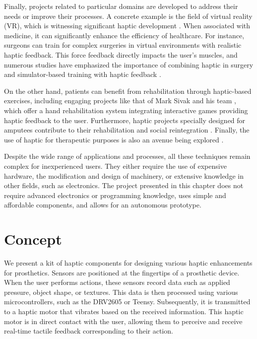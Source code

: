 Finally, projects related to particular domains are developed to address their needs or improve their processes. A concrete example is the field of virtual reality (VR), which is witnessing significant haptic development \cite{leleve_haptic_2020}. When associated with medicine, it can significantly enhance the efficiency of healthcare. For instance, surgeons can train for complex surgeries in virtual environments with realistic haptic feedback. This force feedback directly impacts the user's muscles, and numerous studies have emphasized the importance of combining haptic in surgery and simulator-based training with haptic feedback \cite{noauthor_role_nodate}\cite{willis_virtual_2014}\cite{correa_haptic_2019}\cite{escobar-castillejos_review_2016-1}\cite{singapogu_perspective_2014}\cite{kunkler_role_2006}.

On the other hand, patients can benefit from rehabilitation through haptic-based exercises, including engaging projects like that of Mark Sivak and his team \cite{noauthor_haptic_nodate}, which offer a hand rehabilitation system integrating interactive games providing haptic feedback to the user. Furthermore, haptic projects specially designed for amputees contribute to their rehabilitation and social reintegration \cite{noauthor_pilot_nodate}. Finally, the use of haptic for therapeutic purposes is also an avenue being explored \cite{vaucelle_design_2009}.

Despite the wide range of applications and processes, all these techniques remain complex for inexperienced users. They either require the use of expensive hardware, the modification and design of machinery, or extensive knowledge in other fields, such as electronics. The project presented in this chapter does not require advanced electronics or programming knowledge, uses simple and affordable components, and allows for an autonomous prototype.

\section{Concept}
We present a kit of haptic components for designing various haptic enhancements for prosthetics. Sensors are positioned at the fingertips of a prosthetic device. When the user performs actions, these sensors record data such as applied pressure, object shape, or textures. This data is then processed using various microcontrollers, such as the DRV2605 or Teensy. Subsequently, it is transmitted to a haptic motor that vibrates based on the received information. This haptic motor is in direct contact with the user, allowing them to perceive and receive real-time tactile feedback corresponding to their action.


